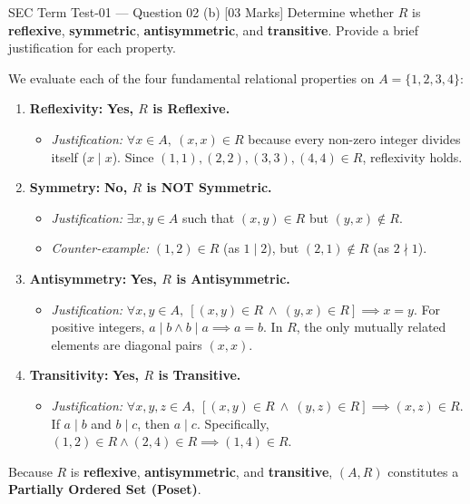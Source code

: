 \documentclass[11pt,a4paper]{article}
\begin{document}
\begin{exambox}[before skip=3pt, after skip=3pt]{SEC Term Test-01 --- Question 02 (b) \hfill [03 Marks]}
\Qlabel
Determine whether $R$ is \textbf{reflexive}, \textbf{symmetric}, \textbf{antisymmetric}, and \textbf{transitive}. Provide a brief justification for each property.

\tcblower

\Alabel
We evaluate each of the four fundamental relational properties on $A = \{1, 2, 3, 4\}$:

\begin{enumerate}[label=\textbf{\arabic*.}, topsep=1pt, itemsep=2pt, parsep=0pt]
    \item \textbf{Reflexivity:} \textbf{\color{teal}Yes, $R$ is Reflexive.}
    \begin{itemize}[topsep=1pt, itemsep=1pt]
        \item \textit{Justification:} $\forall x \in A, \ (x, x) \in R$ because every non-zero integer divides itself ($x \mid x$). Since $(1, 1), (2, 2), (3, 3), (4, 4) \in R$, reflexivity holds.
    \end{itemize}

    \item \textbf{Symmetry:} \textbf{\color{coral}No, $R$ is NOT Symmetric.}
    \begin{itemize}[topsep=1pt, itemsep=1pt]
        \item \textit{Justification:} $\exists x, y \in A$ such that $(x, y) \in R$ but $(y, x) \notin R$.
        \item \textit{Counter-example:} $(1, 2) \in R$ (as $1 \mid 2$), but $(2, 1) \notin R$ (as $2 \nmid 1$).
    \end{itemize}

    \item \textbf{Antisymmetry:} \textbf{\color{teal}Yes, $R$ is Antisymmetric.}
    \begin{itemize}[topsep=1pt, itemsep=1pt]
        \item \textit{Justification:} $\forall x, y \in A, \ [(x, y) \in R \ \wedge \ (y, x) \in R] \implies x = y$. For positive integers, $a \mid b \land b \mid a \implies a = b$. In $R$, the only mutually related elements are diagonal pairs $(x, x)$.
    \end{itemize}

    \item \textbf{Transitivity:} \textbf{\color{teal}Yes, $R$ is Transitive.}
    \begin{itemize}[topsep=1pt, itemsep=1pt]
        \item \textit{Justification:} $\forall x, y, z \in A, \ [(x, y) \in R \ \wedge \ (y, z) \in R] \implies (x, z) \in R$. If $a \mid b$ and $b \mid c$, then $a \mid c$. Specifically, $(1, 2) \in R \land (2, 4) \in R \implies (1, 4) \in R$.
    \end{itemize}
\end{enumerate}

\smallskip
\begin{notebox}
Because $R$ is \textbf{reflexive}, \textbf{antisymmetric}, and \textbf{transitive}, $(A, R)$ constitutes a \textbf{Partially Ordered Set (Poset)}.
\end{notebox}
\end{exambox}
\end{document}
